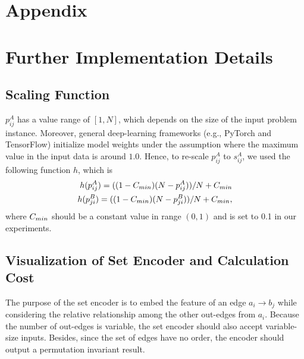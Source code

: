 \appendix

\section*{Appendix}

\section{Further Implementation Details}
\subsection{Scaling Function} \label{ss:sf}
$p^A_{ij}$ has a value range of $[1, N]$, which depends on the size of the input problem instance. Moreover, general deep-learning frameworks (e.g., PyTorch and TensorFlow) initialize model weights under the assumption where the maximum value in the input data is around $1.0$.
Hence, to re-scale $p^A_{ij}$ to $s^A_{ij}$, we used the following function $h$, which is
\begin{equation}
\begin{split}
    h(p^A_{ij}) = ((1-C_{min})(N-p^A_{ij}))/N + C_{min} \\
    h(p^B_{ji}) = ((1-C_{min})(N-p^B_{ji}))/N + C_{min}, \\
\end{split}
\end{equation}
where $C_{min}$ should be a constant value in range $(0,1)$ and is set to 0.1 in our experiments.



\subsection{Visualization of Set Encoder and Calculation Cost} \label{ss:set_encoder}
The purpose of the set encoder is to embed the feature of an edge $a_i\rightarrow b_j$ while considering the relative relationship among the other out-edges from $a_i$.
Because the number of out-edges is variable, the set encoder should also accept variable-size inputs.
Besides, since the set of edges have no order, the encoder should output a permutation invariant result.

